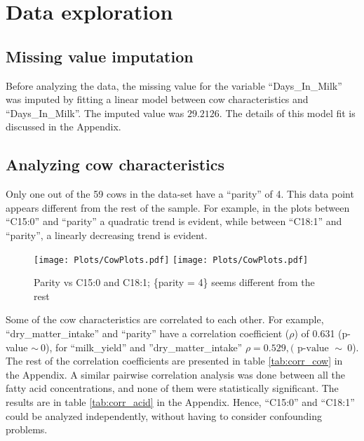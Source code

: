 \section*{Data exploration} \label{Sec_Data}
\subsection*{Missing value imputation}
Before analyzing the data, the missing value for the variable ``Days\_In\_Milk'' was imputed by fitting a linear model between cow characteristics and ``Days\_In\_Milk''. The imputed value was $29.2126$. The details of this model fit is discussed in the Appendix. 

\subsection*{Analyzing cow characteristics}
Only one out of the 59 cows in the data-set have a ``parity'' of 4. This data point appears different from the rest of the sample. For example, in the plots between ``C15:0'' and ``parity'' a quadratic trend is evident, while between ``C18:1'' and ``parity'', a linearly decreasing trend is evident. 

\begin{figure}[H]
\begin{center}
\texttt{[image: Plots/CowPlots.pdf]}
\texttt{[image: Plots/CowPlots.pdf]}
\end{center}
\caption{Parity vs C15:0 and C18:1; \{parity = 4\} seems different from the rest }
\label{fig:Fig1}
\end{figure}

Some of the cow characteristics are correlated to each other. For example, ``dry\_matter\_intake'' and ``parity'' have a correlation coefficient ($\rho$) of 0.631 (p-value $\sim \ 0$), for ``milk\_yield'' and ''dry\_matter\_intake'' $\rho = 0.529, (\text{ p-value } \sim \ 0$). The rest of the correlation coefficients are presented in table \ref{tab:corr_cow} in the Appendix. A similar pairwise correlation analysis was done between all the fatty acid concentrations, and none of them were statistically significant. The results are in table \ref{tab:corr_acid} in the Appendix. Hence, ``C15:0'' and ``C18:1'' could be analyzed independently, without having to consider confounding problems. 

